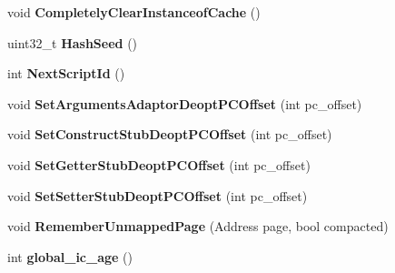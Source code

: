 \begin{DoxyCompactItemize}
\item 
void {\bfseries Completely\+Clear\+Instanceof\+Cache} ()\hypertarget{classv8_1_1internal_1_1_heap_ad79abe29d925f2041fc4a6ca80cf7d0b}{}\label{classv8_1_1internal_1_1_heap_ad79abe29d925f2041fc4a6ca80cf7d0b}

\item 
uint32\+\_\+t {\bfseries Hash\+Seed} ()\hypertarget{classv8_1_1internal_1_1_heap_a936f5a461f0a8a392322a989ffebac3f}{}\label{classv8_1_1internal_1_1_heap_a936f5a461f0a8a392322a989ffebac3f}

\item 
int {\bfseries Next\+Script\+Id} ()\hypertarget{classv8_1_1internal_1_1_heap_a4cd0eb7bcdbdc35990732b983923a67a}{}\label{classv8_1_1internal_1_1_heap_a4cd0eb7bcdbdc35990732b983923a67a}

\item 
void {\bfseries Set\+Arguments\+Adaptor\+Deopt\+P\+C\+Offset} (int pc\+\_\+offset)\hypertarget{classv8_1_1internal_1_1_heap_af4aa1ac48e93ef0c43f074e36c0124a0}{}\label{classv8_1_1internal_1_1_heap_af4aa1ac48e93ef0c43f074e36c0124a0}

\item 
void {\bfseries Set\+Construct\+Stub\+Deopt\+P\+C\+Offset} (int pc\+\_\+offset)\hypertarget{classv8_1_1internal_1_1_heap_a7c85313d66eb4a834d55f4977613ef25}{}\label{classv8_1_1internal_1_1_heap_a7c85313d66eb4a834d55f4977613ef25}

\item 
void {\bfseries Set\+Getter\+Stub\+Deopt\+P\+C\+Offset} (int pc\+\_\+offset)\hypertarget{classv8_1_1internal_1_1_heap_a14fbb12fc49c9059b7bac4f0b375c973}{}\label{classv8_1_1internal_1_1_heap_a14fbb12fc49c9059b7bac4f0b375c973}

\item 
void {\bfseries Set\+Setter\+Stub\+Deopt\+P\+C\+Offset} (int pc\+\_\+offset)\hypertarget{classv8_1_1internal_1_1_heap_a6f34fa136d06fd23213d5213011865fc}{}\label{classv8_1_1internal_1_1_heap_a6f34fa136d06fd23213d5213011865fc}

\item 
void {\bfseries Remember\+Unmapped\+Page} (Address page, bool compacted)\hypertarget{classv8_1_1internal_1_1_heap_a58f38e94ccc5635ac625cb068959ca9e}{}\label{classv8_1_1internal_1_1_heap_a58f38e94ccc5635ac625cb068959ca9e}

\item 
int {\bfseries global\+\_\+ic\+\_\+age} ()\hypertarget{classv8_1_1internal_1_1_heap_a225e87b536dd1c2985a6c63747e68d7a}{}\label{classv8_1_1internal_1_1_heap_a225e87b536dd1c2985a6c63747e68d7a}


\end{DoxyCompactItemize}
